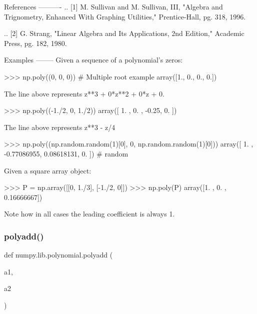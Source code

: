 \begin{DoxyVerb}
References
----------
.. [1] M. Sullivan and M. Sullivan, III, "Algebra and Trignometry,
   Enhanced With Graphing Utilities," Prentice-Hall, pg. 318, 1996.

.. [2] G. Strang, "Linear Algebra and Its Applications, 2nd Edition,"
   Academic Press, pg. 182, 1980.

Examples
--------
Given a sequence of a polynomial's zeros:

>>> np.poly((0, 0, 0)) # Multiple root example
array([1., 0., 0., 0.])

The line above represents z**3 + 0*z**2 + 0*z + 0.

>>> np.poly((-1./2, 0, 1./2))
array([ 1.  ,  0.  , -0.25,  0.  ])

The line above represents z**3 - z/4

>>> np.poly((np.random.random(1)[0], 0, np.random.random(1)[0]))
array([ 1.        , -0.77086955,  0.08618131,  0.        ]) # random

Given a square array object:

>>> P = np.array([[0, 1./3], [-1./2, 0]])
>>> np.poly(P)
array([1.        , 0.        , 0.16666667])

Note how in all cases the leading coefficient is always 1.\end{DoxyVerb}
 \mbox{\label{namespacenumpy_1_1lib_1_1polynomial_a7b851d4c94b92ac3fb467fff3dba805a}} 
\subsubsection{\texorpdfstring{polyadd()}{polyadd()}}
{\footnotesize\ttfamily def numpy.\+lib.\+polynomial.\+polyadd (\begin{DoxyParamCaption}\item[{}]{a1,  }\item[{}]{a2 }\end{DoxyParamCaption})}

